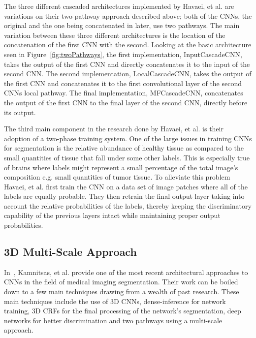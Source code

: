 \documentclass{sig-alternate}
\begin{document}
\begin{figure*}
\centering
{}
\caption{The base two-pathway architecture used by Havaei, et al. Adapted from~\cite{Havaei:2017}.}
\label{fig:twoPathways}
\end{figure*}

The three different cascaded architectures implemented by Havaei, et al. are variations on their two pathway approach described above; both of the CNNs, the original and the one being concatenated in later, use two pathways. The main variation between these three different architectures is the location of the concatenation of the first CNN with the second. Looking at the basic architecture seen in Figure~\ref{fig:twoPathways}, the first implementation, InputCascadeCNN, takes the output of the first CNN and directly concatenates it to the input of the second CNN. The second implementation, LocalCascadeCNN, takes the output of the first CNN and concatenates it to the first convolutional layer of the second CNNs local pathway. The final implementation, MFCascadeCNN, concatenates the output of the first CNN to the final layer of the second CNN, directly before its output.

The third main component in the research done by Havaei, et al. is their adoption of a two-phase training system. One of the large issues in training CNNs for segmentation is the relative abundance of healthy tissue as compared to the small quantities of tissue that fall under some other labels. This is especially true of brains where labels might represent a small percentage of the total image's composition e.g. small quantities of tumor tissue. To alleviate this problem Havaei, et al. first train the CNN on a data set of image patches where all of the labels are equally probable. They then retrain the final output layer taking into account the relative probabilities of the labels, thereby keeping the discriminatory capability of the previous layers intact while maintaining proper output probabilities.



\subsection{3D Multi-Scale Approach}
\label{sec:3DMultiScale}

In~\cite{Kamnitsas:2017}, Kamnitsas, et al. provide one of the most recent architectural approaches to CNNs in the field of medical imaging segmentation. Their work can be boiled down to a few main techniques drawing from a wealth of past research. These main techniques include the use of 3D CNNs, dense-inference for network training, 3D CRFs for the final processing of the network's segmentation, deep networks for better discrimination and two pathways using a multi-scale approach.
\end{document}
